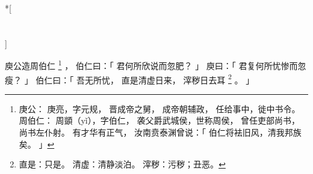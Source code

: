 
\switchcolumn[0]*[\section{}]

庾公造周伯仁%
\footnote{%
    庚公：
        庚亮，字元规，
        晋成帝之舅，
        成帝朝辅政，
        任给事中，徙中书令。
    周伯仁：
        周顗（yǐ），字伯仁，
        袭父爵武城侯，世称周侯，
        曾任吏部尚书，尚书左仆射。
        有才华有正气，
        汝南贲泰渊曾说：「
            伯仁将袪旧风，清我邦族矣。
        」
}%
，
伯仁曰：「
    君何所欣说而忽肥？
」
庾曰：「
    君复何所忧惨而忽瘦？
」
伯仁曰：「
    吾无所忧，
    直是清虚日来，
    滓秽日去耳%
    \footnote{%
        直是：只是。
        清虚：清静淡泊。
        滓秽：污秽；丑恶。
    }%
    。
」

\switchcolumn


